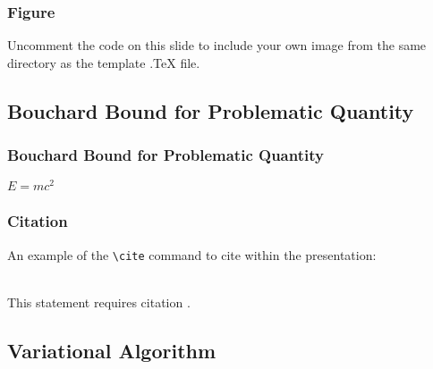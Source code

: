 \documentclass{beamer}
\begin{document}

\begin{frame}
\frametitle{Figure}
Uncomment the code on this slide to include your own image from the same directory as the template .TeX file.
\end{frame}



\subsection{Bouchard Bound for Problematic Quantity}


\begin{frame}
\frametitle{Bouchard Bound for Problematic Quantity}
\begin{theorem}
$E = mc^2$
\end{theorem}
\end{frame}


\begin{frame}[fragile] %
\frametitle{Citation}
An example of the \verb|\cite| command to cite within the presentation:\\~

This statement requires citation \cite{p1}.
\end{frame}

\subsection{Variational Algorithm}
\end{document}

